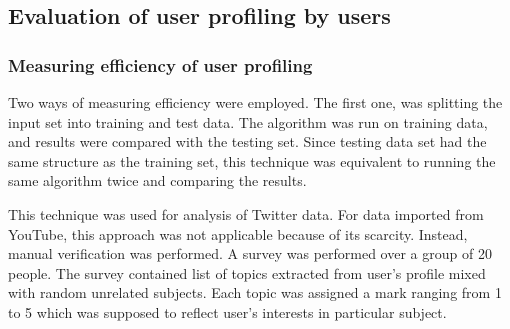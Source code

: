 \subsection{Evaluation of user profiling by users}
\subsubsection{Measuring efficiency of user profiling}

Two ways of measuring efficiency were employed. The first one, was splitting the
input set into training and test data. The algorithm was run on training data,
and results were compared with the testing set. Since testing data set had the
same structure as the training set, this technique was equivalent to running the
same algorithm twice and comparing the results.

This technique was used for analysis of Twitter data. For data imported from
YouTube, this approach was not applicable because of its scarcity. Instead,
manual verification was performed. A survey was performed over a group of 20
people. The survey contained list of topics extracted from user's profile mixed
with random unrelated subjects. Each topic was assigned a mark ranging from 1 to
5 which was supposed to reflect user's interests in particular subject.
